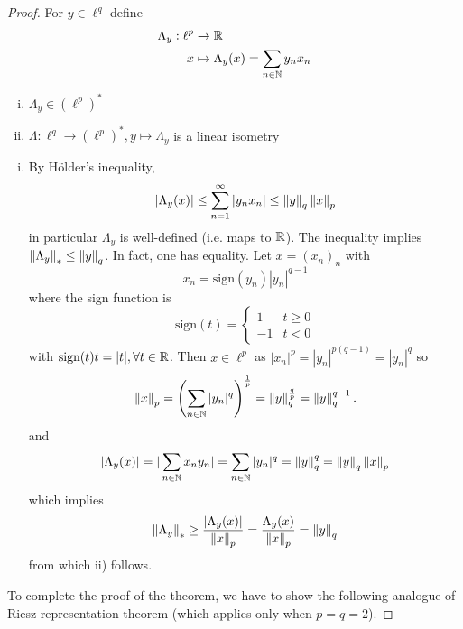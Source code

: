\documentclass{article}
\begin{document}
\begin{proof}
    For  \(y \in \ell^q\) define  
    \begin{align*}
        \Lambda_y: \ell^p &\to \mathbb{R} \\
        x &\mapsto \Lambda_y(x) = \sum_{n \in \mathbb{N}} y_n x_n
    \end{align*}
    
\begin{lemma}
\phantom{a lemma here}
    \label{isometry in lp dual}
\begin{enumerate}[i)]
    \item  \(\Lambda_y \in (\ell^p)^*\)
    \item  \(\Lambda: \ell^q \to (\ell^p)^*, y \mapsto \Lambda_y\) is a linear isometry
\end{enumerate}  
\end{lemma}
\begin{enumerate}[i)]
    \item By Hölder's inequality,  
    	\begin{equation*}
		\left|\Lambda_y(x)\right|
		\leq\sum_{n=1}^{\infty}|y_n x_n|
		\leq\left\|{y}\right\|_q\left\|{x}\right\|_p
	\end{equation*}
	in particular  \(\Lambda_y\) is well-defined (i.e. maps to  \(\mathbb{R}\)). The inequality implies  \(\left\|{\Lambda_y}\right\|_* \leq \left\|{y}\right\|_q\).   
	In fact, one has equality. Let  \(x=(x_n)_n\) with  
	\[x_n = \textrm{sign}(y_n) |y_n|^{q-1}\]
	where the sign function is  
	\begin{equation*}
	    \textrm{sign}(t) = \begin{cases}
	    1 & t \geq 0 \\
	    -1 & t<0
	\end{cases}
	\end{equation*}
	with  \(\textrm{sign}(t)t=|t|, \forall t \in \mathbb{R}\).  
	Then  \(x \in \ell^p\) as  \(|x_n|^p=|y_n|^{p(q-1)}=|y_n|^q\) so  
	\[
	\left\|{x}\right\|_p = \left(\sum_{n \in \mathbb{N}} |y_n|^q\right)^{\frac{1}{p}} = \left\|{y}\right\|_q^{\frac{q}{p}} = \left\|{y}\right\|_q^{q-1}. 
	\]
	and
	\[
	|\Lambda_y(x)| = |\sum_{n \in \mathbb{N}} x_ny_n| = \sum_{n \in \mathbb{N}} |y_n|^q = \left\|{y}\right\|^q_q =\left\|{y}\right\|_q\left\|{x}\right\|_p 
	\]
	which implies  
	\[
        \left\|{\Lambda_y}\right\|_* \geq \frac{|\Lambda_y(x)|}{\left\|{x}\right\|_p} = \frac{\Lambda_y(x)}{\left\|{x}\right\|_p} = \left\|{y}\right\|_q
	\]
        from which ii) follows.
\end{enumerate}
To complete the proof of the theorem, we have to show the following analogue of Riesz representation theorem (which applies only when  \(p=q=2\)).  


\end{proof}
\end{document}
